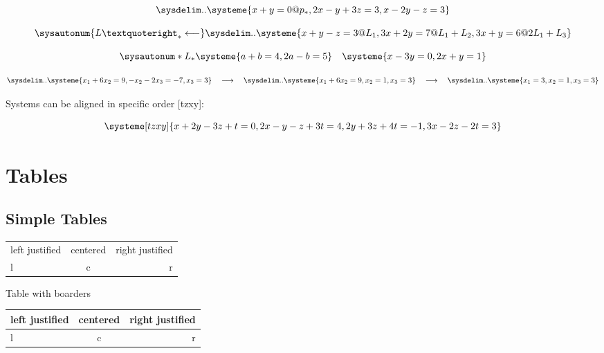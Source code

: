 \documentclass[12pt]{article}
\begin{document}
\begin{equation*}
    \sysdelim..\systeme{
        x + y = 0@p_{*},
        2x - y + 3z = 3,
        x - 2y - z = 3
    }
\end{equation*}

\begin{equation*}
    \sysautonum{L’_{*}\longleftarrow}
    \sysdelim..\systeme{
        x+y-z=3@L_1,
        3x+2y=7@L_1+L_2,
        3x+y=6@2L_1+L_3
    }
\end{equation*}

\begin{equation*}
    \sysautonum*{L_{*}}
    \systeme{a+b=4, 2a-b=5}
    \quad
    \systeme{x-3y=0, 2x+y=1}
\end{equation*}

\begin{equation*}
    \sysdelim..\systeme{
        x_{1} + 6x_{2} = 9,
        - x_{2} - 2x_{3} = -7,
        x_{3} = 3
    }
    \quad
    \longrightarrow
    \quad
    \sysdelim..\systeme{
        x_{1} + 6x_{2} = 9,
        x_{2} = 1,
        x_{3} = 3
    }
    \quad
    \longrightarrow
    \quad
    \sysdelim..\systeme{
        x_{1} = 3,
        x_{2} = 1,
        x_{3} = 3
    }
    \end{equation*}

Systems can be aligned in specific order [tzxy]:

\begin{equation*}
\systeme[tzxy]{
    x+2y-3z+t=0,
    2x-y-z+3t=4,
    2y+3z+4t=-1,
    3x-2z-2t=3
}
\end{equation*}

\section{Tables}

\subsection{Simple Tables}

\begin{tabular}{lcr}
    left justified & centered & right justified \\
    l & c & r
\end{tabular}

\noindent Table with boarders \\

\noindent
\begin{tabular}{ | l |c r| }
    \hline
    left justified & centered & right justified \\
    \hline
    l & c & r \\
    \hline
\end{tabular}
\end{document}
